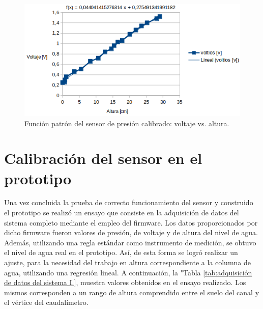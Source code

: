 \begin{figure}[htpb]
	\centering
	\includegraphics[scale=.85]{./Figures/FuncionPatron-Sensor-VoltajeVsAltura.png}
	\caption{Función patrón del sensor de presión calibrado: voltaje vs. altura.}
	\label{fig:Función patrón del sensor de presión calibrado: voltaje vs. altura}
	\end{figure}
\vspace{2cm}	
	
\section{Calibración del sensor en el prototipo
}
\label{sec:Calibración del sensor en el prototipo}
Una vez concluida la prueba de correcto funcionamiento del sensor y construido el prototipo se realizó un ensayo que consiste en la adquisición de datos del sistema completo mediante el empleo del firmware. Los datos proporcionados por dicho firmware fueron valores de presión, de voltaje y de altura del nivel de agua. Además, utilizando una regla estándar como instrumento de medición, se obtuvo el nivel de agua real en el prototipo. Así, de esta forma se logró realizar un ajuste, para la necesidad del trabajo en altura correspondiente a la columna de agua, utilizando una regresión lineal.
A continuación, la "Tabla \ref{tab:adquisición de datos del sistema I.}, muestra valores obtenidos en el ensayo realizado. Los mismos corresponden a un rango de altura comprendido entre el suelo del canal y el vértice del caudalímetro.

